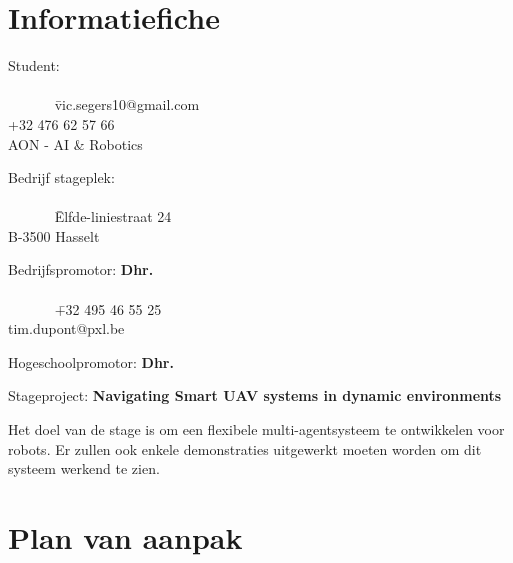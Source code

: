 \documentclass[a4paper]{article}
\begin{document}
  \titlepage{\stagebedrijf}{\student}{\bedrijfspromotor}{\hogeschoolpromotor}

  \begingroup
    \hypersetup{linkcolor=black}  %
    \tableofcontents
  \endgroup


  \section{Informatiefiche}
    \begin{tabbing}
      Student: \textbf{\student}\\
      \\
      ~~~~~~ \= vic.segers10@gmail.com\\
      \> +32 476 62 57 66\\
      \> AON - AI \& Robotics
    \end{tabbing}
    \begin{tabbing}
      Bedrijf stageplek: \textbf{\stagebedrijf}\\
      \\
      ~~~~~~ \= Elfde-liniestraat 24\\
      \> B-3500 Hasselt
    \end{tabbing}
    \begin{tabbing}
      Bedrijfspromotor: \textbf{Dhr. \bedrijfspromotor}\\
      \\
      ~~~~~~ \= +32 495 46 55 25\\
      \> tim.dupont@pxl.be
    \end{tabbing}
    \begin{tabbing}
      Hogeschoolpromotor: \textbf{Dhr. \hogeschoolpromotor}
    \end{tabbing}
    Stageproject: \textbf{Navigating Smart UAV systems in dynamic environments}
    \begin{addmargin}[5ex]{0pt}
      Het doel van de stage is om een flexibele multi-agentsysteem te ontwikkelen voor robots. Er zullen ook enkele demonstraties uitgewerkt moeten worden om dit systeem werkend te zien.
    \end{addmargin}

  \section{Plan van aanpak}
\end{document}
